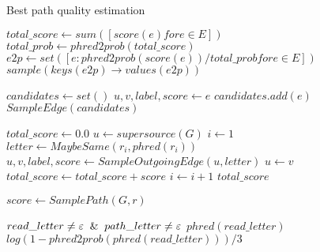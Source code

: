 \begin{algorithm}[H]
	\caption{Best path quality estimation}\label{sampling}
	\begin{algorithmic}[1]
			\State $\mathit{total\_score} \gets \mathit{sum}([score(e) \mathit{for} e \in E])$
			\State $\mathit{total\_prob} \gets \mathit{phred2prob}(\mathit{total\_score})$
			\State $\mathit{e2p} \gets \mathit{set}([e: \mathit{phred2prob}(\mathit{score}(e)) / \mathit{total\_prob} \mathit{for} e \in E])$
			\Return $\mathit{sample}(\mathit{keys(e2p)} \to \mathit{values(e2p)})$
		\EndFunction

		\Statex

			\State $\mathit{candidates} \gets \mathit{set}()$
				\State $u, v, \mathit{label}, \mathit{score} \gets e$
					\State $\mathit{candidates.add}(e)$
				\EndIf
			\EndFor
			\Return $\mathit{SampleEdge}(\mathit{candidates})$  
		\EndFunction

		\Statex

			\State $\mathit{total\_score} \gets 0.0$  
			\State $u \gets \mathit{supersource}(G)$	
			\State $i \gets 1$	
				\State $\mathit{letter} \gets \mathit{MaybeSame}(r_i, \mathit{phred}(r_i))$
				\State $u, v, \mathit{label}, \mathit{score} \gets \mathit{SampleOutgoingEdge}(u, \mathit{letter})$
				\State $u \gets v$
				\State $\mathit{total\_score} \gets \mathit{total\_score} + score$
					\State $i \gets i + 1$
				\EndIf
			\EndWhile
			\Return $\mathit{total\_score}$
		\EndFunction
		
		\Statex

				\State $\mathit{score} \gets \mathit{SamplePath}(G, r)$
				\State {}
			\EndFor
		\EndFunction
		
		\Statex
		
			\Require $read\_letter \neq \epsilon \And path\_letter \neq \epsilon$
				\Return $phred(read\_letter)$
            \Else
				\Return $log(1-phred2prob(phred(read\_letter)))/3$
            \EndIf
		\EndFunction

	\end{algorithmic}
\end{algorithm}




